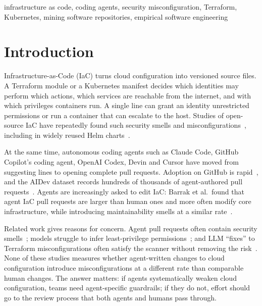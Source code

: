 \documentclass[10pt,conference]{IEEEtran}
\begin{document}
\begin{IEEEkeywords}
infrastructure as code, coding agents, security misconfiguration, Terraform, Kubernetes, mining software repositories, empirical software engineering
\end{IEEEkeywords}

\section{Introduction}
Infrastructure-as-Code (IaC) turns cloud configuration into versioned source files. A Terraform module or a Kubernetes manifest decides which identities may perform which actions, which services are reachable from the internet, and with which privileges containers run. A single line can grant an identity unrestricted permissions or run a container that can escalate to the host. Studies of open-source IaC have repeatedly found such security smells and misconfigurations~\cite{rahman2019sins,rahman2021ansible,rahman2023k8s}, including in widely reused Helm charts~\cite{zerouali2023helm,minna2025helm}.

At the same time, autonomous coding agents such as Claude Code, GitHub Copilot's coding agent, OpenAI Codex, Devin and Cursor have moved from suggesting lines to opening complete pull requests. Adoption on GitHub is rapid~\cite{robbes2026agentic}, and the AIDev dataset records hundreds of thousands of agent-authored pull requests~\cite{li2026aidev}. Agents are increasingly asked to edit IaC: Barrak et al.\ found that agent IaC pull requests are larger than human ones and more often modify core infrastructure, while introducing maintainability smells at a similar rate~\cite{barrak2026agents}.

Related work gives reasons for concern. Agent pull requests often contain security smells~\cite{sakib2026trust}; models struggle to infer least-privilege permissions~\cite{yan2026leastpriv}; and LLM ``fixes'' to Terraform misconfigurations often satisfy the scanner without removing the risk~\cite{alsaid2026terraprobe}. None of these studies measures whether agent-written changes to cloud configuration introduce misconfigurations at a different rate than comparable human changes. The answer matters: if agents systematically weaken cloud configuration, teams need agent-specific guardrails; if they do not, effort should go to the review process that both agents and humans pass through.
\end{document}
